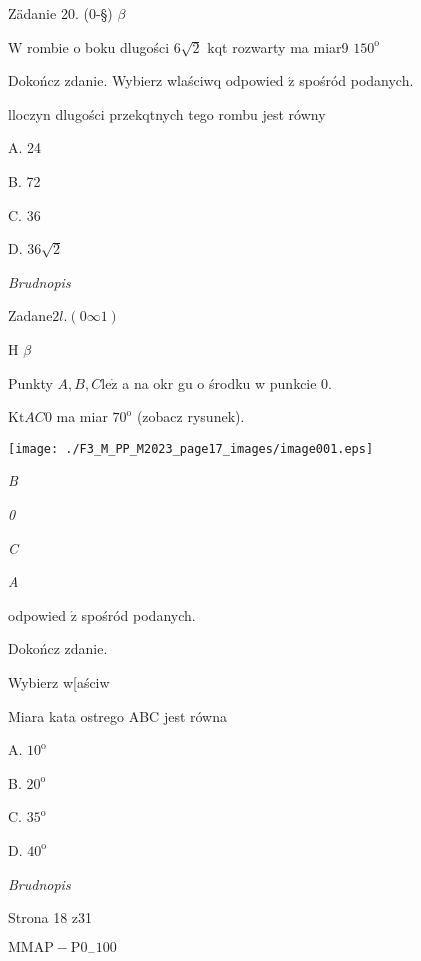 \documentclass[a4paper,12pt]{article}
\begin{document}
Zädanie 20. (0-\S) $\beta$

$\mathrm{W}$ rombie o boku dlugości $6\sqrt{2}$ kqt rozwarty ma miar9 $150^{\mathrm{o}}$

Dokończ zdanie. Wybierz wlaściwq odpowied $\acute{\mathrm{z}}$ spośród podanych.

lloczyn dlugości przekqtnych tego rombu jest równy

A. 24

B. 72

C. 36

D. $36\sqrt{2}$

{\it Brudnopis}

Zadan$\mathrm{e}2l. (0\infty 1)$

H $\beta$

Punkty $A, B, C \mathrm{l}\mathrm{e}\dot{\mathrm{z}}$ a na okr gu o środku w punkcie 0.

$\mathrm{K} \mathrm{t} AC0$ ma miar $70^{\mathrm{o}}$ (zobacz rysunek).
\begin{center}
\texttt{[image: ./F3\_M\_PP\_M2023\_page17\_images/image001.eps]}
\end{center}
{\it B}

{\it 0}

{\it C}

{\it A}

odpowied $\acute{\mathrm{z}}$ spośród podanych.

Dokończ zdanie.

Wybierz w[aściw

Miara kata ostrego ABC jest równa

A. $10^{\mathrm{o}}$

B. $20^{\mathrm{o}}$

C. $35^{\mathrm{o}}$

D. $40^{\mathrm{o}}$

{\it Brudnopis}

Strona 18 z31

$\mathrm{M}\mathrm{M}\mathrm{A}\mathrm{P}-\mathrm{P}0_{-}100$
\end{document}
